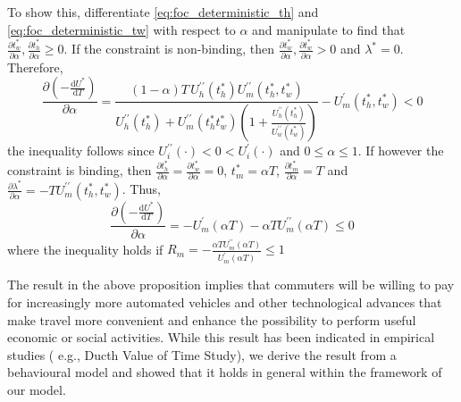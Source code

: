 \documentclass[12pt,a4paper,british]{article}
\makeatletter
\newenvironment{proof}[1][\proofname]{\par
    \normalfont\topsep6\p@\@plus6\p@\relax
    \trivlist
    \itemindent\parindent
    \item[\hskip\labelsep
          \scshape
      #1]\ignorespaces
  }{%
    \endtrivlist\@endpefalse
  }
\providecommand{\proofname}{Proof}
\makeatother
\begin{document}
\begin{proof}
To show this, differentiate \eqref{eq:foc_deterministic_th} and \eqref{eq:foc_deterministic_tw} with respect to $\alpha$ and manipulate to find that $\frac{\partial t_{w}^{\ast}}{\partial\alpha} , \frac{\partial t_{h}^{\ast}}{\partial\alpha} \geq 0$. If the constraint is non-binding, then $\frac{\partial t_{w}^{\ast}}{\partial\alpha}, \frac{\partial t_{w}^{\ast}}{\partial\alpha} > 0$ and $\lambda^{\ast} = 0$. Therefore,%
\begin{equation*}
\frac{\partial\left( - \frac{\mathrm{d}U^{\ast}}{\mathrm{d}T}\right)}{\partial\alpha} = \frac{\left(1 - \alpha\right) T \, U_{h}^{\prime\prime}\left(t_{h}^{\ast}\right) U_{m}^{\prime\prime}\left(t_{h}^{\ast},t_{w}^{\ast} \right)} {U_{h}^{\prime\prime}\left(t_{h}^{\ast}\right) + U_{m}^{\prime\prime}\left(t_{h}^{\ast} t_{w}^{\ast}\right)\left(1+\frac{U_{h}^{\prime\prime}\left(t_{h}^{\ast}\right)}{U_{w}^{\prime\prime}\left(t_{w}^{\ast}\right)}\right)}-U_{m}^{\prime}\left(t_{h}^{\ast}, t_{w}^{\ast}\right) < 0
\end{equation*}
the inequality follows since $U_i^{\prime\prime}\left( \cdot \right) <  0 < U_i^{\prime}\left( \cdot \right)$ and $0\leq \alpha \leq 1$. If however the constraint is binding, then $\frac{\partial t_{h}^{\ast}}{\partial\alpha}=\frac{\partial t_{w}^{\ast}}{\partial\alpha} = 0$, $t_m^{\ast} = \alpha T$, $\frac{\partial t_{m}^{\ast}}{\partial\alpha}=T$ and $\frac{\partial\lambda^{\ast}}{\partial\alpha}=-TU_{m}^{\prime\prime}\left(t_{h}^{\ast}, t_{w}^{\ast}\right)$. Thus,%
\begin{equation*}
\frac{\partial\left(-\frac{\mathrm{d}U^{\ast}}{\mathrm{d}T}\right)}{\partial\alpha}= - U_{m}^{\prime}\left(\alpha T \right) - \alpha T U_{m}^{\prime\prime}\left(\alpha T \right) \leq 0
\end{equation*}
where the inequality holds if $R_m = -\frac{\alpha T U_{m}^{\prime\prime}\left(\alpha T \right)}{U_{m}^{\prime}\left(\alpha T \right)} \leq 1$

\end{proof}


The result in the above proposition implies that commuters will be willing to pay for increasingly more automated vehicles and other technological advances that make travel more convenient and enhance the possibility to perform useful economic or social activities. While this result has been indicated in empirical studies ({\color{red} e.g., Ducth Value of Time Study}), we derive the result from a behavioural model and showed that it holds in general within the framework of our model.
\end{document}
